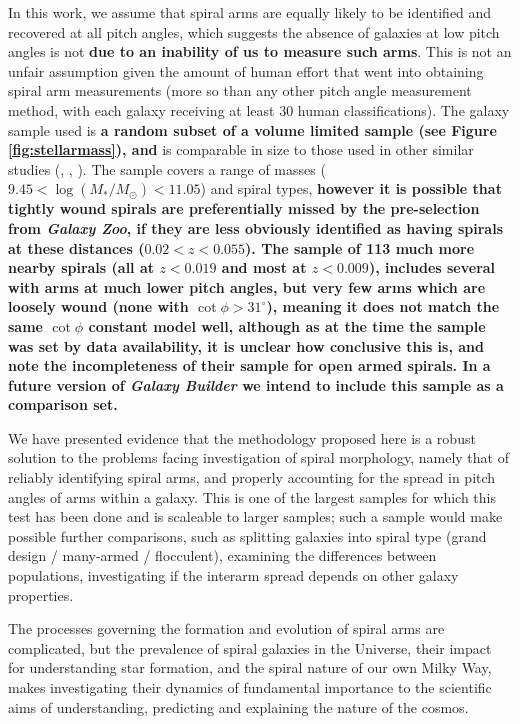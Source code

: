 In this work, we assume that spiral arms are equally likely to be identified and recovered at all pitch angles, which suggests the absence of galaxies at low pitch angles is not {\bf due to an inability of us to measure such arms}. This is not an unfair assumption given the amount of human effort that went into obtaining spiral arm measurements (more so than any other pitch angle measurement method, with each galaxy receiving at least 30 human classifications). The galaxy sample used is {\bf a random subset of a volume limited sample (see Figure \ref{fig:stellarmass}), and} is comparable in size to those used in other similar studies (\citealt{2013MNRAS.436.1074S}, \citealt{2019ApJ...871..194Y}, \citealt{2019arXiv190910291P}). The sample covers a range of masses ($9.45 < \log(M_* / M_\odot) < 11.05$) and spiral types, {\bf however it is possible that tightly wound spirals are preferentially missed by the pre-selection from {\it Galaxy Zoo}, if they are less obviously identified as having spirals at these distances ($0.02<z<0.055$). The \citet{1981AJ.....86.1847K} sample of 113 much more nearby spirals (all at $z<0.019$ and most at $z<0.009$), includes several with arms at much lower pitch angles, but very few arms which are loosely wound (none with $\cot \phi > 31^\circ$), meaning it does not match the same $\cot \phi$ constant model well, although as at the time the sample was set by data availability, it is unclear how conclusive this is, and \citet{1981AJ.....86.1847K} note the incompleteness of their sample for open armed spirals. In a future version of {\it Galaxy Builder} we intend to include this sample as a comparison set.}

We have presented evidence that the methodology proposed here is a robust solution to the problems facing investigation of spiral morphology, namely that of reliably identifying spiral arms, and properly accounting for the spread in pitch angles of arms within a galaxy. This is one of the largest samples for which this test has been done and is scaleable to larger samples; such a sample would make possible further comparisons, such as splitting galaxies into spiral type (grand design / many-armed / flocculent), examining the differences between populations, investigating if the interarm spread depends on other galaxy properties.

The processes governing the formation and evolution of spiral arms are complicated, but the prevalence of spiral galaxies in the Universe, their impact for understanding star formation, and the spiral nature of our own Milky Way, makes investigating their dynamics of fundamental importance to the scientific aims of understanding, predicting and explaining the nature of the cosmos.
